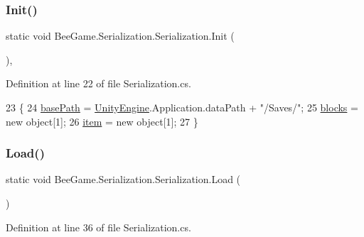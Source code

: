 \subsubsection{\texorpdfstring{Init()}{Init()}}
{\footnotesize\ttfamily static void Bee\+Game.\+Serialization.\+Serialization.\+Init (\begin{DoxyParamCaption}{ }\end{DoxyParamCaption})\hspace{0.3cm}{\ttfamily [static]}, {\ttfamily [private]}}



Definition at line 22 of file Serialization.\+cs.


\begin{DoxyCode}
23         \{
24             \hyperlink{class_bee_game_1_1_serialization_1_1_serialization_ab90922fcf58a723ce591487507356310}{basePath} = \hyperlink{namespace_unity_engine}{UnityEngine}.Application.dataPath + \textcolor{stringliteral}{"/Saves/"};
25             \hyperlink{class_bee_game_1_1_serialization_1_1_serialization_a0b8dee0f221f22b34bb3de8c146b4d0d}{blocks} = \textcolor{keyword}{new} \textcolor{keywordtype}{object}[1];
26             \hyperlink{class_bee_game_1_1_serialization_1_1_serialization_af3359d6ca7e84c9e52a790beb1cc502e}{item} = \textcolor{keyword}{new} \textcolor{keywordtype}{object}[1];
27         \}
\end{DoxyCode}
\mbox{\label{class_bee_game_1_1_serialization_1_1_serialization_a08f39770d6cc2b4a86fd7d7f00ff56a7}} 
\subsubsection{\texorpdfstring{Load()}{Load()}}
{\footnotesize\ttfamily static void Bee\+Game.\+Serialization.\+Serialization.\+Load (\begin{DoxyParamCaption}{ }\end{DoxyParamCaption})\hspace{0.3cm}{\ttfamily [static]}}



Definition at line 36 of file Serialization.\+cs.


